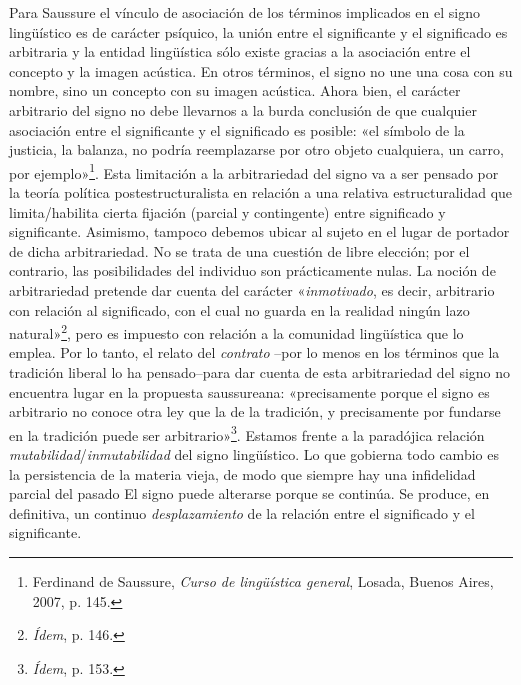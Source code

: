 Para Saussure el vínculo de asociación de los términos implicados en el signo lingüístico es de carácter psíquico, la unión entre el significante y el significado es arbitraria y la entidad lingüística sólo existe gracias a la asociación entre el concepto y la imagen acústica. En otros términos, el signo no une una cosa con su nombre, sino un concepto con su imagen acústica. Ahora bien, el carácter arbitrario del signo no debe llevarnos a la burda conclusión de que cualquier asociación entre el significante y el significado es posible: «el símbolo de la justicia, la balanza, no podría reemplazarse por otro objeto cualquiera, un carro, por ejemplo»\footnote{Ferdinand de Saussure, \emph{Curso de lingüística general}, Losada, Buenos Aires, 2007, p. 145.}. Esta limitación a la arbitrariedad del signo va a ser pensado por la teoría política postestructuralista en relación a una relativa estructuralidad que limita/habilita cierta fijación (parcial y contingente) entre significado y significante. Asimismo, tampoco debemos ubicar al sujeto en el lugar de portador de dicha arbitrariedad. No se trata de una cuestión de libre elección; por el contrario, las posibilidades del individuo son prácticamente nulas. La noción de arbitrariedad pretende dar cuenta del carácter «\emph{inmotivado}, es decir, arbitrario con relación al significado, con el cual no guarda en la realidad ningún lazo natural»\footnote{\emph{Ídem}, p. 146.}, pero es impuesto con relación a la comunidad lingüística que lo emplea. Por lo tanto, el relato del \emph{contrato} --por lo menos en los términos que la tradición liberal lo ha pensado--para dar cuenta de esta arbitrariedad del signo no encuentra lugar en la propuesta saussureana: «precisamente porque el signo es arbitrario no conoce otra ley que la de la tradición, y precisamente por fundarse en la tradición puede ser arbitrario»\footnote{\emph{Ídem}, p. 153.}. Estamos frente a la paradójica relación \emph{mutabilidad}/\emph{inmutabilidad} del signo lingüístico. Lo que gobierna todo cambio es la persistencia de la materia vieja, de modo que siempre hay una infidelidad parcial del pasado El signo puede alterarse porque se continúa. Se produce, en definitiva, un continuo \emph{desplazamiento} de la relación entre el significado y el significante.

